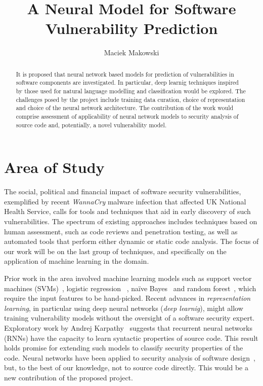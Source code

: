 \documentclass[proposal]{softeng}
\begin{document}
\title{A Neural Model for Software Vulnerability Prediction}
\author{Maciek Makowski}
\maketitle

\begin{abstract}
It is proposed that neural network based models for prediction of vulnerabilities in
software components are investigated. In particular, deep learnig techniques 
inspired by those used for natural language modelling and classification 
would be explored.
The challenges posed by the project include training data curation,
choice of representation and choice of the neural network architecture.
The contribution of the work would comprise assessment of applicability of
neural network models to security analysis of source code and, potentially, a novel
vulnerability model.
\end{abstract}

\section{Area of Study}

The social, political and financial impact of software security vulnerabilities, 
exemplified by recent \emph{WannaCry} malware infection that affected
UK National Health Service, calls 
for tools and techniques that aid in early discovery of such vulnerabilities. 
The spectrum of existing approaches includes techniques based on human assessment,
such as code reviews and penetration testing, as well as automated tools that perform
either dynamic or static code analysis. The focus of our work will be on the last 
group of techniques, and specifically on the application of machine learning in the
domain.

Prior work in the area involved machine learning models such as support vector
machines (SVMs)~\cite{neuhaus2007predicting,perl2015vccfinder}, logistic regression 
~\cite{hata2010fault}, naïve Bayes~\cite{hata2010fault,scandariato2014predicting} 
and random forest~\cite{scandariato2014predicting}, which require the input features 
to be hand-picked.
Recent advances in \emph{representation learning}, in particular using deep
neural networks (\emph{deep learnig}), might allow training vulnerability models 
without the oversight of a software security expert. Exploratory work by Andrej 
Karpathy~\cite{karpathy2015unreasonable} suggests that recurrent neural networks 
(RNNs) have the capacity to learn syntactic properties of source code.
This result holds promise for extending such models to classify security properties
of the code. Neural networks have been applied to security analysis of software 
design~\cite{adebiyi2013security}, but, to the best of our knowledge, not to
source code directly. This would be a new contribution of the proposed project.
\end{document}
